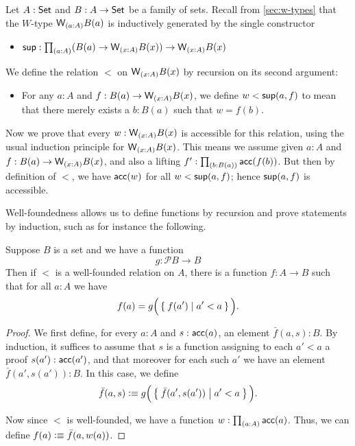 \begin{eg}\label{thm:wtype-wf}
  Let $A:\mathsf{Set}$ and $B : A \to \mathsf{Set}$ be a family of sets.
  Recall from \autoref{sec:w-types} that the $W$-type $\wtype{a:A} B(a)$ is inductively generated by the single constructor
  \begin{itemize}
  \item $\supp : \prd{a:A} (B(a) \to \wtype{x:A} B(x)) \to \wtype{x:A} B(x)$
  \end{itemize}
  We define the relation $<$ on $\wtype{x:A} B(x)$ by recursion on its second argument:
  \begin{itemize}
  \item For any $a:A$ and $f:B(a) \to \wtype{x:A} B(x)$, we define $w<{\mathsf{sup}}(a,f)$ to mean that there merely exists a $b:B(a)$ such that $w = f(b)$.
  \end{itemize}
  Now we prove that every $w:\wtype{x:A} B(x)$ is accessible for this relation, using the usual induction principle for $\wtype{x:A}B(x)$.
  This means we assume given $a:A$ and $f:B(a) \to \wtype{x:A} B(x)$, and also a lifting $f' : \prd{b:B(a)} \acc(f(b))$.
  But then by definition of $<$, we have $\mathsf{acc}(w)$ for all $w<{\mathsf{sup}}(a,f)$; hence ${\mathsf{sup}}(a,f)$ is accessible.
\end{eg}

Well-foundedness allows us to define functions by recursion and prove statements by induction, such as for instance the following.

\begin{lem}\label{thm:wfrec}
  Suppose $B$ is a set and we have a function
  \[ g : \mathcal{P}B \to B \]
  Then if $<$ is a well-founded relation on $A$, there is a function $f:A\to B$ such that for all $a:A$ we have
  \begin{equation*}
    f(a) = g\Big(\Set{ f(a') | a'<a }\Big).
  \end{equation*}
\end{lem}
\begin{proof}
  We first define, for every $a:A$ and $s:\mathsf{acc}(a)$, an element $\bar f(a,s):B$.
  By induction, it suffices to assume that $s$ is a function assigning to each $a'<a$ a proof $s(a'):\mathsf{acc}(a')$, and that moreover for each such $a'$ we have an element $\bar f(a',s(a')):B$.
  In this case, we define
  \begin{equation*}
    \bar f(a,s) \vcentcolon\equiv g\Big(\Set{ \bar f(a',s(a')) | a'<a }\Big).
  \end{equation*}

  Now since $<$ is well-founded, we have a function $w:\prd{a:A} \acc(a)$.
  Thus, we can define $f(a)\vcentcolon\equiv \bar f (a,w(a))$.
\end{proof}

